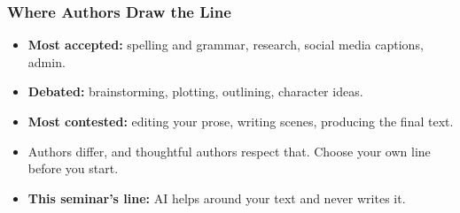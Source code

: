
\begin{frame}[fragile]\frametitle{Where Authors Draw the Line}
\begin{itemize}
\item \textbf{Most accepted:} spelling and grammar, research, social media captions, admin.
\item \textbf{Debated:} brainstorming, plotting, outlining, character ideas.
\item \textbf{Most contested:} editing your prose, writing scenes, producing the final text.
\item Authors differ, and thoughtful authors respect that. Choose your own line before you start.
\item \textbf{This seminar's line:} AI helps around your text and never writes it.
\end{itemize}
\end{frame}

